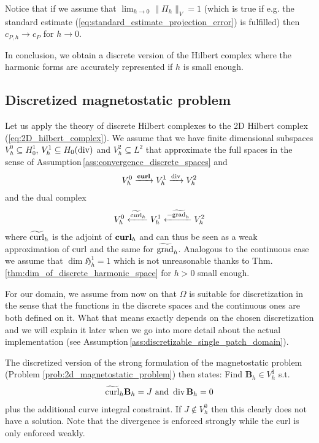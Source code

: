 \documentclass[../master_thesis.tex]{subfiles}
\begin{document}
Notice that if we assume that $\lim_{h \rightarrow 0} \lVert \Pi_h \rVert _V = 1$ 
(which is true if e.g. the standard estimate (\ref{eq:standard_estimate_projection_error}) is fulfilled)
then $c_{P,h} \rightarrow c_P$ for $h \rightarrow 0$.

In conclusion, we obtain a discrete version of the Hilbert complex where the harmonic forms are 
accurately represented if $h$ is small enough.

\subsection{Discretized magnetostatic problem}

Let us apply the theory of discrete Hilbert complexes to the 2D Hilbert complex (\ref{eq:2D_hilbert_complex}).
We assume that we have finite dimensional subspaces
$V^0_h \subseteq H^1_0$, $V^1_h \subseteq H_0(\operatorname{div})$ and $V^2_h \subseteq L^2$ 
that approximate the full spaces in the sense of Assumption\,\ref{ass:convergence_discrete_spaces} and
\begin{align*}
    V^0_h \xrightarrow{\veccurl} V^1_h \xrightarrow{\diver} V^2_h
\end{align*}
and the dual complex 
\begin{align*}
    V^0_h \xleftarrow{\widetilde{\operatorname{curl}}_h} V^1_h \xleftarrow{-\widetilde{\operatorname{grad}}_h} V^2_h
\end{align*}
where $\widetilde{\operatorname{curl}}_h$ is the adjoint of $\veccurl_h$ and can thus be 
seen as a weak approximation of $\operatorname{curl}$ and the same for $\widetilde{\operatorname{grad}}_h$.
Analogous to the continuous case we assume that $\dim \mathfrak{H}_h^1 = 1$ 
which is not unreasonable thanks to Thm.\,\ref{thm:dim_of_discrete_harmonic_space} 
for $h>0$ small enough.

For our domain, we assume from now on that $\Omega$ is suitable for discretization in the 
sense that the functions in the discrete spaces and the continuous ones 
are both defined on it. What that means exactly depends on the chosen discretization 
and we will explain it later when we go into more detail about the 
actual implementation (see Assumption\,\ref{ass:discretizable_single_patch_domain}). 

The discretized version of the strong formulation of the magnetostatic problem 
(Problem \ref{prob:2d_magnetostatic_problem}) 
then states: 
Find $\mathbf{B}_h \in V_h^1$ s.t.
\begin{align*}
    \widetilde{\operatorname{curl}}_h \mathbf{B}_h = J \text{ and }
    \operatorname{div} \mathbf{B}_h = 0
\end{align*}
plus the additional curve integral constraint. If $J \notin V_h^0$ then this 
clearly does not have a solution.
Note that the divergence is enforced strongly while the curl is only enforced weakly.
\end{document}
